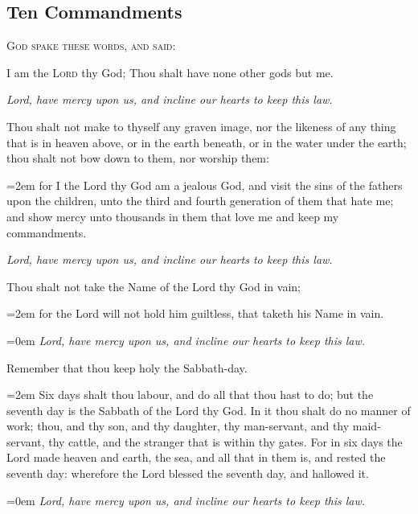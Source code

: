 \subsection{Ten Commandments}
\begin{center}
	\textsc{God spake these words, and said:}
\end{center}
\par\noindent
    I am the \textsc{Lord} thy God; Thou shalt have none other gods but me.\par
    \textit{Lord, have mercy upon us, and incline our hearts to keep this law.}
    \par\noindent
    Thou shalt not make to thyself any graven image, nor the likeness of any thing that is in heaven above, or in the earth beneath, or in the water under the earth; thou shalt not bow down to them, nor worship them:
    \par\noindent
    \leftskip=2em
	{\small{for I the Lord thy God am a jealous God, and visit the sins of the fathers upon the children, unto the third and fourth generation of them that hate me; and show mercy unto thousands in them that love me and keep my commandments.}}
	\par
	\leftskip=0cm
    \textit{Lord, have mercy upon us, and incline our hearts to keep this law.}
    \par\noindent
    Thou shalt not take the Name of the Lord thy God in vain;
    \par\noindent
    \leftskip=2em
	{\small{for the Lord will not hold him guiltless, that taketh his Name in vain.}}
	\par
	\leftskip=0em
    \textit{Lord, have mercy upon us, and incline our hearts to keep this law.}
    \par\noindent
    Remember that thou keep holy the Sabbath-day.
    \par\noindent
    \leftskip=2em
	{\small{Six days shalt thou labour, and do all that thou hast to do; but the seventh day is the Sabbath of the Lord thy God. In it thou shalt do no manner of work; thou, and thy son, and thy daughter, thy man-servant, and thy maid-servant, thy cattle, and the stranger that is within thy gates. For in six days the Lord made heaven and earth, the sea, and all that in them is, and rested the seventh day: wherefore the Lord blessed the seventh day, and hallowed it.}}
	\par
	\leftskip=0em
    \textit{Lord, have mercy upon us, and incline our hearts to keep this law.}
